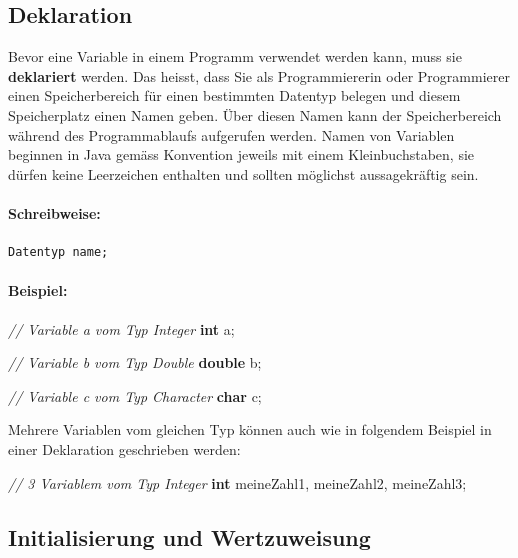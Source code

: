 \documentclass[10pt,paper=17cm:22cm, twoside=true, DIV=14]{scrbook}
\newenvironment {Shaded}
        {\begin{mdframed}[style=code] }
         {\end{mdframed}}
\newcommand{\DataTypeTok}[1]{\textcolor[rgb]{0.1,0.1,0.1}{\textbf{#1}}}
\newcommand{\CommentTok}[1]{\textcolor[RGB]{128,128,128}{\textit{#1}}}
\newcommand{\NormalTok}[1]{#1}
\begin{document}
\subsection{Deklaration}\label{deklaration-1}

Bevor eine Variable in einem Programm verwendet werden kann, muss sie
\textbf{deklariert} werden. Das heisst, dass Sie als Programmiererin
oder Programmierer einen Speicherbereich für einen bestimmten Datentyp
belegen und diesem Speicherplatz einen Namen geben. Über diesen Namen
kann der Speicherbereich während des Programmablaufs aufgerufen werden.
Namen von Variablen beginnen in Java gemäss Konvention jeweils mit einem
Kleinbuchstaben, sie dürfen keine Leerzeichen enthalten und sollten
möglichst aussagekräftig sein.

\paragraph{Schreibweise:}\label{schreibweise-3}

\begin{verbatim}
Datentyp name;
\end{verbatim}

\paragraph{Beispiel:}\label{beispiel-10}

\begin{Shaded}
\begin{Highlighting}[]
\CommentTok{// Variable a vom Typ Integer}
\DataTypeTok{int} \NormalTok{a;}

\CommentTok{// Variable b vom Typ Double}
\DataTypeTok{double} \NormalTok{b;}

\CommentTok{// Variable c vom Typ Character}
\DataTypeTok{char} \NormalTok{c;}
\end{Highlighting}
\end{Shaded}

Mehrere Variablen vom gleichen Typ können auch wie in folgendem Beispiel
in einer Deklaration geschrieben werden:

\begin{Shaded}
\begin{Highlighting}[]
\CommentTok{// 3 Variablem vom Typ Integer}
\DataTypeTok{int} \NormalTok{meineZahl1, meineZahl2, meineZahl3;}
\end{Highlighting}
\end{Shaded}

\subsection{Initialisierung und
Wertzuweisung}\label{initialisierung-und-wertzuweisung-1}
\end{document}

